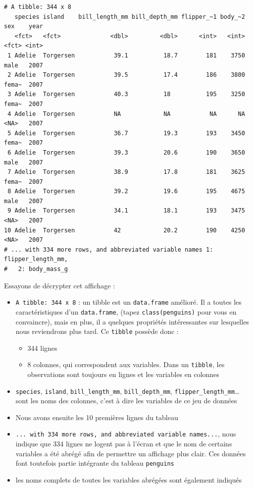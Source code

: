 \documentclass[
  letterpaper,
  DIV=11,
  numbers=noendperiod]{scrreprt}
\providecommand{\tightlist}{%
  \setlength{\itemsep}{0pt}\setlength{\parskip}{0pt}}\usepackage{longtable,booktabs,array}
\begin{document}
\begin{verbatim}
# A tibble: 344 x 8
   species island    bill_length_mm bill_depth_mm flipper_~1 body_~2 sex    year
   <fct>   <fct>              <dbl>         <dbl>      <int>   <int> <fct> <int>
 1 Adelie  Torgersen           39.1          18.7        181    3750 male   2007
 2 Adelie  Torgersen           39.5          17.4        186    3800 fema~  2007
 3 Adelie  Torgersen           40.3          18          195    3250 fema~  2007
 4 Adelie  Torgersen           NA            NA           NA      NA <NA>   2007
 5 Adelie  Torgersen           36.7          19.3        193    3450 fema~  2007
 6 Adelie  Torgersen           39.3          20.6        190    3650 male   2007
 7 Adelie  Torgersen           38.9          17.8        181    3625 fema~  2007
 8 Adelie  Torgersen           39.2          19.6        195    4675 male   2007
 9 Adelie  Torgersen           34.1          18.1        193    3475 <NA>   2007
10 Adelie  Torgersen           42            20.2        190    4250 <NA>   2007
# ... with 334 more rows, and abbreviated variable names 1: flipper_length_mm,
#   2: body_mass_g
\end{verbatim}

Essayons de décrypter cet affichage :

\begin{itemize}
\tightlist
\item
  \texttt{A\ tibble:\ 344\ x\ 8} : un tibble est un \texttt{data.frame}
  amélioré. Il a toutes les caractéristiques d'un \texttt{data.frame},
  (tapez \texttt{class(penguins)} pour vous en convaincre), mais en
  plus, il a quelques propriétés intéressantes sur lesquelles nous
  reviendrons plus tard. Ce \texttt{tibble} possède donc :

  \begin{itemize}
  \tightlist
  \item
    344 lignes
  \item
    8 colonnes, qui correspondent aux variables. Dans un
    \texttt{tibble}, les observations sont toujours en lignes et les
    variables en colonnes
  \end{itemize}
\item
  \texttt{species}, \texttt{island}, \texttt{bill\_length\_mm},
  \texttt{bill\_depth\_mm}, \texttt{flipper\_length\_mm}\ldots{} sont
  les noms des colonnes, c'est à dire les variables de ce jeu de données
\item
  Nous avons ensuite les 10 premières lignes du tableau
\item
  \texttt{...\ with\ 334\ more\ rows,\ and\ abbreviated\ variable\ names...},
  nous indique que 334 lignes ne logent pas à l'écran et que le nom de
  certains variables a été abrégé afin de permettre un affichage plus
  clair. Ces données font toutefois partie intégrante du tableau
  \texttt{penguins}
\item
  les noms complets de toutes les variables abrégées sont également
  indiqués
\end{itemize}
\end{document}
